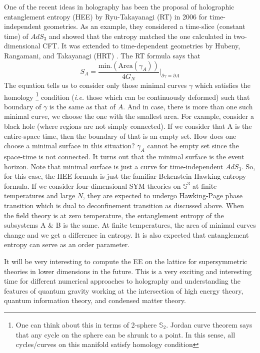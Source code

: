 One of the recent ideas in holography has been the proposal of holographic entanglement entropy (HEE) 
by Ryu-Takayanagi (RT) in 2006 for time-independent geometries. As an example, 
they considered a time-slice (constant time) of $AdS_{3}$ and showed that the entropy matched the 
one calculated in two-dimensional CFT. 
It was extended to time-dependent geometries by Hubeny, Rangamani, and Takayanagi (HRT) 
\cite{2007JHEP...07..062H}.
The RT formula says that 
\begin{equation}
S_{A} = \frac{\text{min.}(\text{Area}(\gamma_{A}))}{4G_{N}} \Bigg \vert_{\partial \gamma = \partial A} 
\end{equation} 
The equation tells us to consider only those minimal curves $\gamma$ which satisfies
the homology \footnote{One can think about this in terms of 2-sphere $\mathbb{S}_{2}$. 
Jordan curve theorem says that any cycle on the sphere can be shrunk to a point. In this 
sense, all cycles/curves on this manifold satisfy homology condition} condition (\emph{i.e.} 
those which can be continuously deformed) such that boundary of $\gamma$ is the same as 
that of $A$. And in case, there is more than one such minimal curve, we choose the one with 
the smallest area. 
For example, consider a black hole (where regions are not simply connected). 
If we consider that A is the entire-space time, then the boundary of that is an empty set. 
How does one choose a minimal surface in this situation? $\gamma_{A}$ cannot be empty set since the 
space-time is not connected. It turns out that the minimal surface is the event horizon. 
Note that minimal surface is just a curve for time-independent $AdS_{3}$.
So, for this case, the HEE formula is just the familiar Bekenstein-Hawking entropy formula. 
If we consider four-dimensional SYM theories on $\mathbb{S}^{3}$ 
at finite temperatures and large $N$, they are expected to undergo Hawking-Page phase 
transition which is dual to deconfinement transition as discussed above. When the field 
theory is at zero temperature, the entanglement entropy of the subsystems A $\&$ B is 
the same. At finite temperatures, the area of minimal curves change and we get a difference 
in entropy. It is also expected that entanglement entropy can serve as an order parameter. 

It will be very interesting to compute the EE on the lattice for supersymmetric theories
in lower dimensions in the future. This is a very exciting and interesting time for different numerical 
approaches to holography and understanding the features of quantum gravity working at the intersection 
of high energy theory, quantum information theory, and condensed matter theory.

